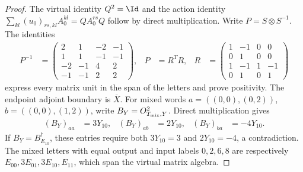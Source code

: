 \begin{proof}
    \leanok
    The virtual identity $Q^2=\Id$ and the action identity
    $\sum_{kl}(u_0)_{rs,kl}A_0^{kl}=QA_0^{rs}Q$ follow by direct
    multiplication. Write $P=S\otimes S^{-1}$. The identities
    \begin{align}
        P^{-1} & =\begin{pmatrix}
                      2 & 1 & -2 & -1 \\1&1&-1&-1\\-2&-1&4&2\\-1&-1&2&2
                  \end{pmatrix}, &
        P      & =R^TR,                                            &
        R      & =\begin{pmatrix}
                      1 & -1 & 0 & 0 \\0&1&0&0\\1&-1&1&-1\\0&1&0&1
                  \end{pmatrix}
        \label{eq:mpo_endpoint_adjoint_gram}
    \end{align}
    express every matrix unit in the span of the letters and prove
    positivity. The endpoint adjoint boundary is $\overline X$.
    For mixed words $a=((0,0),(0,2))$, $b=((0,0),(1,2))$, write
    $B_Y=O^2_{T_{\rm mix},Y}$. Direct multiplication gives
    \begin{align}
        (B_Y)_{aa} & =3Y_{10},  &
        (B_Y)_{ab} & =2Y_{10},  &
        (B_Y)_{ba} & =-4Y_{10}.
        \label{eq:mpo_endpoint_adjoint_obstruction}
    \end{align}
    If $B_Y=B_{E_{10}}^\dagger$, these entries require both
    $3Y_{10}=3$ and $2Y_{10}=-4$, a contradiction. The mixed letters
    with equal output and input labels $0,2,6,8$ are respectively
    $E_{00},3E_{01},3E_{10},E_{11}$, which span the virtual matrix algebra.
\end{proof}
